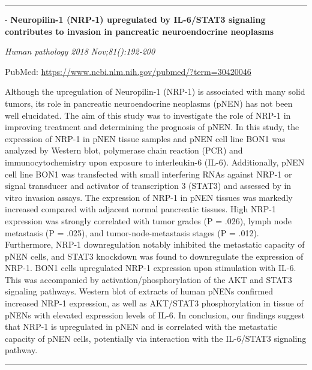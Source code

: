 \documentclass[]{article}
\begin{document}
{}

{}

\begin{center}\rule{0.5\linewidth}{\linethickness}\end{center}

 - \textbf{Neuropilin-1 (NRP-1) upregulated by IL-6/STAT3 signaling
contributes to invasion in pancreatic neuroendocrine neoplasms}

\emph{Human pathology 2018 Nov;81():192-200}

PubMed: \url{https://www.ncbi.nlm.nih.gov/pubmed/?term=30420046}

Although the upregulation of Neuropilin-1 (NRP-1) is associated with
many solid tumors, its role in pancreatic neuroendocrine neoplasms
(pNEN) has not been well elucidated. The aim of this study was to
investigate the role of NRP-1 in improving treatment and determining the
prognosis of pNEN. In this study, the expression of NRP-1 in pNEN tissue
samples and pNEN cell line BON1 was analyzed by Western blot, polymerase
chain reaction (PCR) and immunocytochemistry upon exposure to
interleukin-6 (IL-6). Additionally, pNEN cell line BON1 was transfected
with small interfering RNAs against NRP-1 or signal transducer and
activator of transcription 3 (STAT3) and assessed by in vitro invasion
assays. The expression of NRP-1 in pNEN tissues was markedly increased
compared with adjacent normal pancreatic tissues. High NRP-1 expression
was strongly correlated with tumor grades (P = .026), lymph node
metastasis (P = .025), and tumor-node-metastasis stages (P = .012).
Furthermore, NRP-1 downregulation notably inhibited the metastatic
capacity of pNEN cells, and STAT3 knockdown was found to downregulate
the expression of NRP-1. BON1 cells upregulated NRP-1 expression upon
stimulation with IL-6. This was accompanied by
activation/phosphorylation of the AKT and STAT3 signaling pathways.
Western blot of extracts of human pNENs confirmed increased NRP-1
expression, as well as AKT/STAT3 phosphorylation in tissue of pNENs with
elevated expression levels of IL-6. In conclusion, our findings suggest
that NRP-1 is upregulated in pNEN and is correlated with the metastatic
capacity of pNEN cells, potentially via interaction with the IL-6/STAT3
signaling pathway.

{}

{}

\begin{center}\rule{0.5\linewidth}{\linethickness}\end{center}
\end{document}
